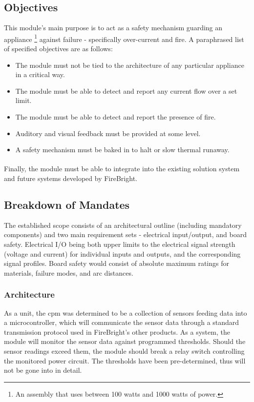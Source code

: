 \documentclass[12pt]{article}
\begin{document}
  \subsection{Objectives}
  This module's main purpose is to act as a safety mechanism guarding an appliance \footnote{An assembly that uses between 100 watts and 1000 watts of power.} against failure - specifically over-current and fire. A paraphrased list of specified objectives are as follows:

  \begin{itemize}
  \item The module must not be tied to the architecture of any particular appliance in a critical way. 
  \item The module must be able to detect and report any current flow over a set limit.
  \item The module must be able to detect and report the presence of fire.
  \item Auditory and visual feedback must be provided at some level.
  \item A safety mechanism must be baked in to halt or slow thermal runaway.
  \end{itemize}

  
  \paragraph{}
  Finally, the module must be able to integrate into the existing solution system and future systems developed by FireBright.

	
	\subsection{Breakdown of Mandates\label{sec:breakdown-mandates}}
	The established scope consists of an architectural outline (including mandatory components) and two main requirement sets - electrical input/output, and board safety. Electrical I/O being both upper limits to the electrical signal strength (voltage and current) for individual inputs and outputs, and the corresponding signal profiles. Board safety would consist of absolute maximum ratings for materials, failure modes, and arc distances.
	
    \subsubsection{Architecture\label{sec:architecture}}
    As a unit, the \acrshort{cpm} was determined to be a collection of sensors feeding data into a microcontroller, which will communicate the sensor data through a standard transmission protocol used in FireBright's other products. As a system, the module will monitor the sensor data against programmed thresholds. Should the sensor readings exceed them, the module should break a relay switch controlling the monitored power circuit. The thresholds have been pre-determined, thus will not be gone into in detail. 
\end{document}
